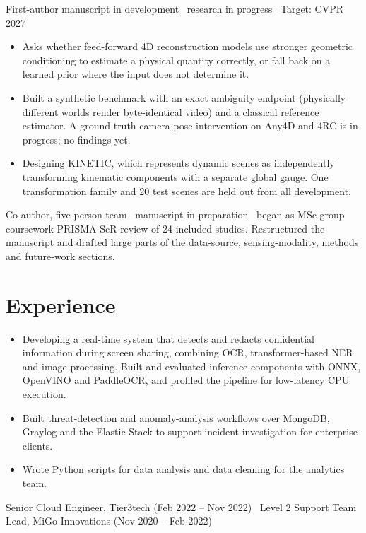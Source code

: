 \documentclass[10pt]{article}
\begin{document}
\gap
{}
  {First-author manuscript in development \textbullet\ research in progress \textbullet\ Target: CVPR 2027}{}
\begin{itemize}
  \item Asks whether feed-forward 4D reconstruction models use stronger geometric conditioning to estimate a
    physical quantity correctly, or fall back on a learned prior where the input does not determine it.
  \item Built a synthetic benchmark with an exact ambiguity endpoint (physically different worlds render
    byte-identical video) and a classical reference estimator. A ground-truth camera-pose intervention on Any4D and
    4RC is in progress; no findings yet.
  \item Designing KINETIC, which represents dynamic scenes as independently transforming kinematic components with a
    separate global gauge. One transformation family and 20 test scenes are held out from all development.
\end{itemize}
\gap
{}
  {Co-author, five-person team \textbullet\ manuscript in preparation \textbullet\ began as MSc group coursework}{}
PRISMA-ScR review of 24 included studies. Restructured the manuscript and drafted large parts of the data-source,
sensing-modality, methods and future-work sections.

\section{Experience}
\begin{itemize}
  \item Developing a real-time system that detects and redacts confidential information during screen sharing,
    combining OCR, transformer-based NER and image processing. Built and evaluated inference components with ONNX,
    OpenVINO and PaddleOCR, and profiled the pipeline for low-latency CPU execution.
\end{itemize}
\gap
{}
\begin{itemize}
  \item Built threat-detection and anomaly-analysis workflows over MongoDB, Graylog and the Elastic Stack to support
    incident investigation for enterprise clients.
\end{itemize}
\gap
{}
\begin{itemize}
  \item Wrote Python scripts for data analysis and data cleaning for the analytics team.
\end{itemize}
\gap
{}
  {Senior Cloud Engineer, Tier3tech (Feb 2022 -- Nov 2022) \textbullet\ Level 2 Support Team Lead, MiGo Innovations (Nov 2020 -- Feb 2022)}{}
\end{document}
